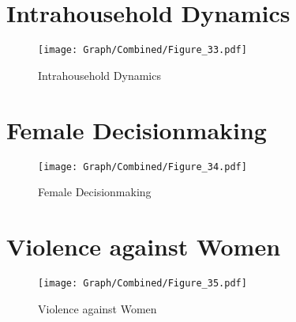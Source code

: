 \documentclass[10pt,a4paper]{article}
\begin{document}
\section{Intrahousehold Dynamics}
\begin{table}[H]\centering

\end{table}
\begin{figure}[H]\centering
\texttt{[image: Graph/Combined/Figure\_33.pdf]}
\caption{Intrahousehold Dynamics} \label{fig:Fig_33}
\end{figure}
\begin{table}[H]\centering

\end{table}
\section{Female Decisionmaking}
\begin{table}[H]\centering

\end{table}
\begin{figure}[H]\centering
\texttt{[image: Graph/Combined/Figure\_34.pdf]}
\caption{Female Decisionmaking} \label{fig:Fig_34}
\end{figure}
\begin{table}[H]\centering

\end{table}
\section{Violence against Women}
\begin{table}[H]\centering

\end{table}
\begin{figure}[H]\centering
\texttt{[image: Graph/Combined/Figure\_35.pdf]}
\caption{Violence against Women} \label{fig:Fig_35}
\end{figure}
\begin{table}[H]\centering

\end{table}
\end{document}
